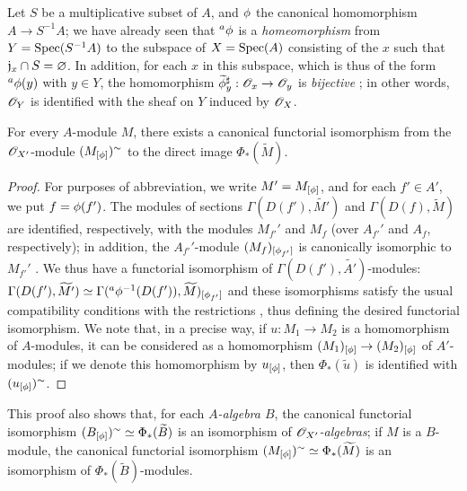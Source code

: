 \begin{example}[1.6.2]
\label{1.1.6.2}
Let $S$ be a multiplicative subset of $A$, and $\phi$ the canonical homomorphism $A\to S^{-1}A$;
we have already seen  that ${}^a\phi$ is a \emph{homeomorphism} from $Y=\operatorname{Spec}(S^{-1}A)$ to the subspace of $X=\operatorname{Spec}(A)$ consisting of the $x$ such that $\mathfrak{j}_x\cap S=\varnothing$.
In addition, for each $x$ in this subspace, which is thus of the form ${}^a\phi(y)$ with $y\in Y$, the homomorphism $\widetilde{\vphi}_y^\sharp:\sh{O}_x\to\sh{O}_y$ is
\emph{bijective} ;
in other words, $\mathscr{O}_Y$ is identified with the sheaf on $Y$ induced by $\mathscr{O}_X$.
\end{example}

\begin{proposition}[1.6.3]
\label{1.1.6.3}
For every $A$-module $M$, there exists a canonical functorial isomorphism from the $\mathscr{O}_{X'}$-module $(M_{[\phi]})^\sim$ to the direct image $\Phi_*(\widetilde{M})$.
\end{proposition}

\begin{proof}
\label{proof-1.1.6.3}
For purposes of abbreviation, we write $M'=M_{[\phi]}$, and for each $f'\in A'$, we put $f=\phi(f')$.
The modules of sections $\Gamma(D(f'),\widetilde{M'})$ and $\Gamma(D(f),\widetilde{M})$ are identified, respectively, with the modules $M_{f'}'$ and $M_f$ (over $A_{f'}'$ and $A_f$, respectively);
in addition, the $A_{f'}'$-module $(M_f)_{[\phi_{f'}]}$ is canonically isomorphic to $M_{f'}'$ .
We thus have a functorial isomorphism of $\Gamma(D(f'),\widetilde{A'})$-modules: $\Gamma(D(f'),\widetilde{M'}) \simeq\Gamma({}^a\phi^{-1}(D(f')),\widetilde{M})_{[\phi_{f'}]}$ and these isomorphisms satisfy the usual compatibility conditions with the restrictions , thus defining the desired functorial isomorphism.
We note that, in a precise way, if $u:M_1\to M_2$ is a homomorphism of $A$-modules, it can be considered as a homomorphism $(M_1)_{[\vphi]}\to(M_2)_{[\vphi]}$ of $A'$-modules;
if we denote this homomorphism by $u_{[\phi]}$, then $\Phi_*(\widetilde{u})$ is identified with $(u_{[\phi]})^\sim$.
\end{proof}

This proof also shows that, for each \emph{$A$-algebra $B$}, the canonical functorial isomorphism
$(B_{[\phi]})^\sim\simeq\Phi_*(\widetilde{B})$ is an isomorphism of \emph{$\mathscr{O}_{X'}$-algebras};
if $M$ is a $B$-module, the canonical functorial isomorphism $(M_{[\phi]})^\sim\simeq\Phi_*(\widetilde{M})$ is an isomorphism of $\Phi_*(\widetilde{B})$-modules.

